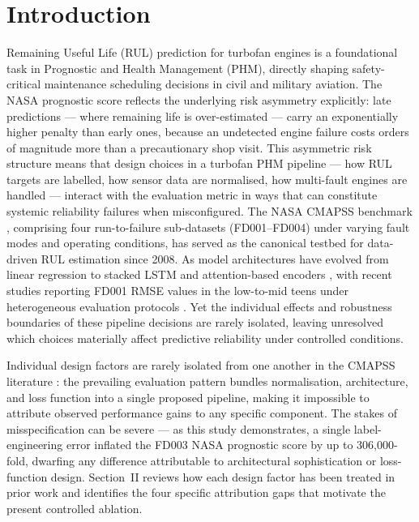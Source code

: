 \documentclass[preprint,10pt]{elsarticle}
\begin{document}
\linenumbers


\section{Introduction}

Remaining Useful Life (RUL) prediction for turbofan engines is a foundational task in Prognostic and Health Management (PHM), directly shaping safety-critical maintenance scheduling decisions in civil and military aviation. The NASA prognostic score reflects the underlying risk asymmetry explicitly: late predictions — where remaining life is over-estimated — carry an exponentially higher penalty than early ones, because an undetected engine failure costs orders of magnitude more than a precautionary shop visit. This asymmetric risk structure means that design choices in a turbofan PHM pipeline — how RUL targets are labelled, how sensor data are normalised, how multi-fault engines are handled — interact with the evaluation metric in ways that can constitute systemic reliability failures when misconfigured. The NASA CMAPSS benchmark \cite{ref01}, comprising four run-to-failure sub-datasets (FD001–FD004) under varying fault modes and operating conditions, has served as the canonical testbed for data-driven RUL estimation since 2008. As model architectures have evolved from linear regression \cite{ref02} to stacked LSTM \cite{ref05,ref06} and attention-based encoders \cite{ref13,ref14,ref45}, with recent studies reporting FD001 RMSE values in the low-to-mid teens under heterogeneous evaluation protocols \cite{ref13,ref15,ref29}. Yet the individual effects and robustness boundaries of these pipeline decisions are rarely isolated, leaving unresolved which choices materially affect predictive reliability under controlled conditions.

Individual design factors are rarely isolated from one another in the CMAPSS literature \cite{ref03,ref17}: the prevailing evaluation pattern bundles normalisation, architecture, and loss function into a single proposed pipeline, making it impossible to attribute observed performance gains to any specific component. The stakes of misspecification can be severe --- as this study demonstrates, a single label-engineering error inflated the FD003 NASA prognostic score by up to 306,000-fold, dwarfing any difference attributable to architectural sophistication or loss-function design. Section~II reviews how each design factor has been treated in prior work and identifies the four specific attribution gaps that motivate the present controlled ablation.
\end{document}
